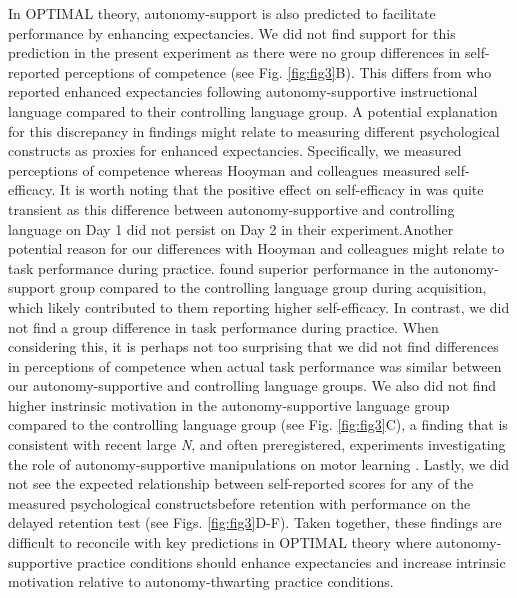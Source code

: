 \documentclass[man,floatsintext,donotrepeattitle,letterpaper,12pt]{apa7}
\begin{document}
In OPTIMAL theory, autonomy-support is also predicted to facilitate performance by enhancing expectancies. We did not find support for this prediction in the present experiment as there were no group differences in self-reported perceptions of competence (see Fig. \ref{fig:fig3}B). This differs from \textcite{hooyman2014} who reported enhanced expectancies following autonomy-supportive instructional language compared to their controlling language group. A potential explanation for this discrepancy in findings might relate to measuring different psychological constructs as proxies for enhanced expectancies. Specifically, we measured perceptions of competence whereas Hooyman and colleagues measured self-efficacy. It is worth noting that the positive effect on self-efficacy in \textcite{hooyman2014} was quite transient as this difference between autonomy-supportive and controlling language on Day 1 did not persist on Day 2 in their experiment.\footnotemark Another potential reason for our differences with Hooyman and colleagues might relate to task performance during practice. \textcite{hooyman2014} found superior performance in the autonomy-support group compared to the controlling language group during acquisition, which likely contributed to them reporting higher self-efficacy. In contrast, we did not find a group difference in task performance during practice. When considering this, it is perhaps not too surprising that we did not find differences in perceptions of competence when actual task performance was similar between our autonomy-supportive and controlling language groups. We also did not find higher instrinsic motivation in the autonomy-supportive language group compared to the controlling language group (see Fig. \ref{fig:fig3}C), a finding that is consistent with recent large \emph{N}, and often preregistered, experiments investigating the role of autonomy-supportive manipulations on motor learning \autocite[e.g.,][]{bacelar2022,stgermain2022,stgermain2023}. Lastly, we did not see the expected relationship between self-reported scores for any of the measured psychological constructsbefore retention with performance on the delayed retention test (see Figs. \ref{fig:fig3}D-F). Taken together, these findings are difficult to reconcile with key predictions in OPTIMAL theory \autocite{wulf2016} where autonomy-supportive practice conditions should enhance expectancies and increase intrinsic motivation relative to autonomy-thwarting practice conditions.
\end{document}
